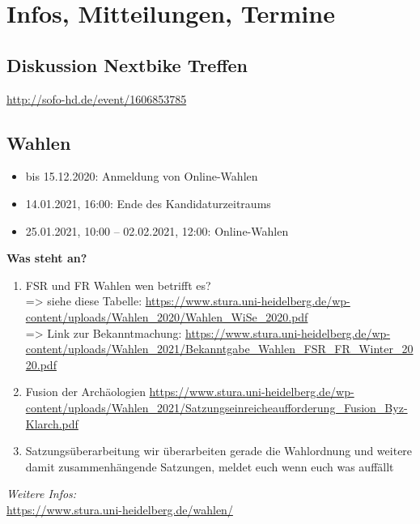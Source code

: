 \section{Infos, Mitteilungen, Termine}
\subsection{Diskussion Nextbike Treffen}
\url{http://sofo-hd.de/event/1606853785}

\subsection{Wahlen}
\begin{itemize}
    \item bis 15.12.2020: Anmeldung von Online-Wahlen
    \item 14.01.2021, 16:00: Ende des Kandidaturzeitraums
    \item 25.01.2021, 10:00 – 02.02.2021, 12:00: Online-Wahlen
\end{itemize}
\textbf{Was steht an?}
\begin{enumerate}
    \item FSR und FR Wahlen wen betrifft es? \\
    => siehe diese Tabelle: \url{https://www.stura.uni-heidelberg.de/wp-content/uploads/Wahlen_2020/Wahlen_WiSe_2020.pdf}\\
    => Link zur Bekanntmachung: \url{https://www.stura.uni-heidelberg.de/wp-content/uploads/Wahlen_2021/Bekanntgabe_Wahlen_FSR_FR_Winter_2020.pdf}
    \item Fusion der Archäologien \url{https://www.stura.uni-heidelberg.de/wp-content/uploads/Wahlen_2021/Satzungseinreicheaufforderung_Fusion_Byz-Klarch.pdf}
    \item  Satzungsüberarbeitung wir überarbeiten gerade die Wahlordnung und weitere damit zusammenhängende Satzungen, meldet euch wenn euch was auffällt
\end{enumerate}
\emph{Weitere Infos:}\\
\url{https://www.stura.uni-heidelberg.de/wahlen/}